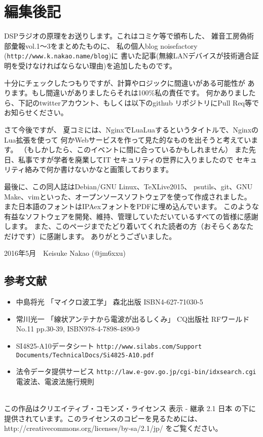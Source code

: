 \section*{編集後記}
DSPラジオの原理をお送りします。これはコミケ等で頒布した、
雑音工房偽術部彙報vol.1〜3をまとめたものに、
私の個人blog noisefactory (\texttt{http://www.k.nakao.name/blog})に
書いた記事(無線LANデバイスが技術適合証明を受けなければならない理由)を追加したものです。

十分にチェックしたつもりですが、計算やロジックに間違いがある可能性が
あります。もし間違いがありましたらそれは100\%私の責任です。
何かありましたら、下記のtwitterアカウント、もしくは以下のgithub
リポジトリにPull Req等でお知らせください。


さて今後ですが、
夏コミには、NginxでLuaLuaするというタイトルで、NginxのLua拡張を使って
何かWebサービスを作って見た的なものを出そうと考えています。
（もしかしたら、このイベントに間に合っているかもしれません）
また先日、私事ですが学者を廃業してIT セキュリティの世界に入りましたので
セキュリティ絡みで何か書けないかなと画策しております。

最後に、この同人誌はDebian/GNU Linux、\TeX Live2015、
psutils、git、GNU Make、vimといった、オープンソースソフトウェアを使って作成されました。
また日本語のフォントはIPAexフォントをPDFに埋め込んでいます。
このような有益なソフトウェアを開発、維持、管理していただいているすべての皆様に感謝します。
また、このページまでたどり着いてくれた読者の方（おそらくあなただけです）に感謝します。
ありがとうございました。

\begin{flushright}
2016年5月　Keisuke Nakao (@jm6xxu) 
\end{flushright}
\clearpage
\subsection*{参考文献}
\begin{itemize}
  \item 中島将光
    「マイクロ波工学」 森北出版 ISBN4-627-71030-5
  \item 常川光一
    「線状アンテナから電波が出るしくみ」 CQ出版社 RFワールド No.11 pp.30-39, ISBN978-4-7898-4890-9

  \item 
    SI4825-A10データシート \texttt{http://www.silabs.com/Support Documents/TechnicalDocs/Si4825-A10.pdf}
	\item
	法令データ提供サービス \texttt{http://law.e-gov.go.jp/cgi-bin/idxsearch.cgi} 電波法、電波法施行規則
   \end{itemize}
\clearpage
\mbox{}
\vspace{36em}\\
この作品はクリエイティブ・コモンズ・ライセンス 表示 - 継承 2.1 日本 の下に提供されています。このライセンスのコピーを見るためには、http://creativecommons.org/licenses/by-sa/2.1/jp/ をご覧ください。
